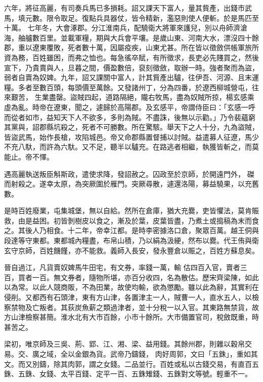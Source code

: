 \begin{pinyinscope}
 六年，將征高麗，有司奏兵馬已多損耗。詔又課天下富人，量其貲產，出錢市武馬，填元數。限令取足。復點兵具器仗，皆令精新，濫惡則使人便斬。於是馬匹至十萬。
 七年冬，大會涿郡。分江淮南兵，配驍衛大將軍來護兒，別以舟師濟滄海，舳艫數百里。並載軍糧，期與大兵會平壤。是歲山東、河南大水，漂沒四十餘郡，重以遼東覆敗，死者數十萬，因屬疫疾，山東尤甚。所在皆以徵斂供帳軍旅所資為務，百姓雖困，而弗之恤也。每急徭卒賦，有所徵求，長吏必先賤買之，然後宣下，乃貴賣與人，旦暮之間，價盈數倍，裒刻徵斂，取辦一時。強者聚而為盜，弱者自賣為奴婢。九年，詔又課關中富人，計其貲產出驢，往伊吾、河源、且末運糧。多者至數百頭，每頭價至萬餘。又發諸州丁，分為四番，於遼西柳城營屯，往來艱苦，
 生業盡罄。盜賊四起，道路隔絕，隴右牧馬，盡為奴賊所掠，楊玄感乘虛為亂。時帝在遼東，聞之，遽歸於高陽郡。及玄感平，帝謂侍臣曰：「玄感一呼而從者如市，益知天下人不欲多，多則為賊。不盡誅，後無以示勸。」乃令裴蘊窮其黨與，詔郡縣坑殺之，死者不可勝數。所在驚駭。舉天下之人十分，九為盜賊，皆盜武馬，始作長槍，攻陷城邑。帝又命郡縣置督捕以討賊。益遣募人征遼，馬少不充八馱，而許為六馱。又不足，聽半以驢充。在路逃者相繼，執獲皆斬之，而莫能止。帝不懌。



 遇高麗執送叛臣斛斯政，遣使求降，發詔赦之。囚政至於京師，於開遠門外，
 磔而射殺之。遂幸太原，為突厥圍於雁門。突厥尋散，遽還洛陽，募益驍果，以充舊數。



 是時百姓廢業，屯集城堡，無以自給。然所在倉庫，猶大充爨，吏皆懼法，莫肯賑救，由是益困。初皆剝樹皮以食之，漸及於葉，皮葉皆盡，乃煮土或搗稿為末而食之。其後人乃相食。十二年，帝幸江都。是時李密據洛口倉，聚眾百萬。越王侗與段達等守東都。東都城內糧盡，布帛山積，乃以絹為汲綆，然布以爨。代王侑與衛玄守京師，百姓饑饉，亦不能救。義師入長安，發永豐倉以賑之，百姓方蘇息矣。



 晉自過江，凡貨賣奴婢馬牛田宅，有文券，率錢一萬，輸
 估四百入官，賣者三百，買者一百。無文券者，隨物所堪，亦百分收四，名為散估。歷宋齊梁陳，如此以為常。以此人競商販，不為田業，故使均輸，欲為懲勵。雖以此為辭，其實利在侵削。又都西有石頭津，東有方山津，各置津主一人，賊曹一人，直水五人，以檢察禁物及亡叛者。其荻炭魚薪之類過津者，並十分稅一以入官。其東路無禁貨，故方山津檢察甚簡。淮水北有大市百餘，小市十餘所。大市備置官司，稅斂既重，時甚苦之。



 梁初，唯京師及三吳、荊、郢、江、湘、梁、益用錢。其餘州郡，則雜以穀帛交易。交、廣之域，全以金銀為貨。武帝乃鑄錢，
 肉好周郭，文曰「五銖」，重如其文。而又別鑄，除其肉郭，謂之女錢。二品並行。百姓或私以古錢交易，有直百五銖、五銖、女錢、太平百錢、定平一百、五銖雉錢、五銖對文等號。輕重不一。




\end{pinyinscope}
